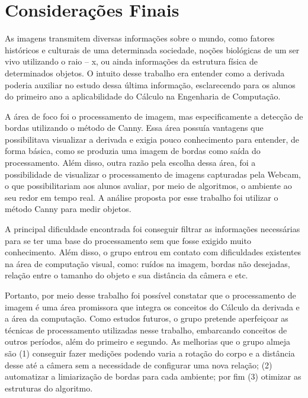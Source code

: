 \documentclass[12pt]{article}
\begin{document}
	\section{Considerações Finais}
	
	As imagens transmitem diversas informações sobre o mundo, como fatores históricos e culturais de uma determinada sociedade, noções biológicas de um ser vivo utilizando o raio – x, ou ainda informações da estrutura física de determinados objetos. O intuito desse trabalho era entender como a derivada poderia auxiliar no estudo dessa última informação, esclarecendo para os alunos do primeiro ano a aplicabilidade do Cálculo na Engenharia de Computação.
	
	A área de foco foi o processamento de imagem, mas especificamente a detecção de bordas utilizando o método de Canny. Essa área possuía vantagens que possibilitava visualizar a derivada e exigia pouco conhecimento para entender, de forma básica, como se produzia uma imagem de bordas como saída do processamento. Além disso, outra razão pela escolha dessa área, foi a possibilidade de visualizar o processamento de imagens capturadas pela Webcam, o que possibilitariam aos alunos avaliar, por meio de algoritmos, o ambiente ao seu redor em tempo real. A análise proposta por esse trabalho foi utilizar o método Canny para medir objetos. 
	
	A principal dificuldade encontrada foi conseguir filtrar as informações necessárias para se ter uma base do processamento sem que fosse exigido muito conhecimento. Além disso, o grupo entrou em contato com dificuldades existentes na área de computação visual, como: ruídos na imagem, bordas não desejadas, relação entre o tamanho do objeto e sua distância da câmera e etc.
	
	Portanto, por meio desse trabalho foi possível constatar que o processamento de imagem é uma área promissora que integra os conceitos do Cálculo da derivada e a área da computação. Como estudos futuros, o grupo pretende aperfeiçoar as técnicas de processamento utilizadas nesse trabalho, embarcando conceitos de outros períodos, além do primeiro e segundo. As melhorias que o grupo almeja são (1) conseguir fazer medições podendo varia a rotação do corpo e a distância desse até a câmera sem a necessidade de configurar uma nova relação; (2) automatizar a limiarização de bordas para cada ambiente; por fim (3) otimizar as estruturas do algoritmo.
	
	
	
	
\end{document}

